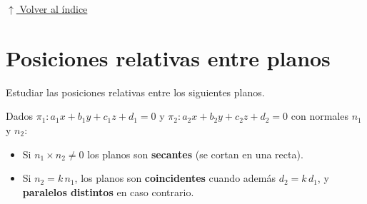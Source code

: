 \documentclass[12pt]{article}
\newcommand{\volverindice}{%
    \vspace{1em}%
    \begin{flushright}%
        \hyperlink{indice}{\small $\uparrow$ Volver al índice}%
    \end{flushright}%
}
\begin{document}
\volverindice
\newpage


\section{Posiciones relativas entre planos}

Estudiar las posiciones relativas entre los siguientes planos.

Dados $\pi_1: a_1x+b_1y+c_1z+d_1=0$ y $\pi_2: a_2x+b_2y+c_2z+d_2=0$ con
normales $n_1$ y $n_2$:

\begin{itemize}
    \item Si $n_1\times n_2\neq0$ los planos son \textbf{secantes} (se
    cortan en una recta).
    \item Si $n_2=k\,n_1$, los planos son \textbf{coincidentes} cuando
    además $d_2=k\,d_1$, y \textbf{paralelos distintos} en caso contrario.
\end{itemize}
\end{document}
